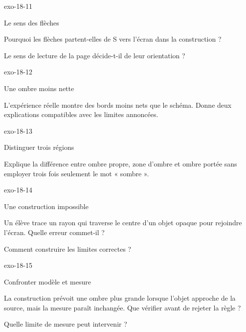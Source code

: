 \documentclass[12pt,twoside,openany]{book}
\begin{document}
\begin{blocLivre}{exo-18-11}
\begin{exercice}[2]{Le sens des flèches}
\begin{questions}
\item Pourquoi les flèches partent-elles de S vers l’écran dans la construction ?
\item Le sens de lecture de la page décide-t-il de leur orientation ?
\end{questions}
\end{exercice}\end{blocLivre}
\begin{blocLivre}{exo-18-12}
\begin{exercice}[3]{Une ombre moins nette}
\begin{questions}
\item L’expérience réelle montre des bords moins nets que le schéma. Donne deux explications compatibles avec les limites annoncées.
\end{questions}
\end{exercice}\end{blocLivre}
\clearpage
\begin{blocLivre}{exo-18-13}
\begin{exercice}[3]{Distinguer trois régions}
\begin{questions}
\item Explique la différence entre ombre propre, zone d’ombre et ombre portée sans employer trois fois seulement le mot « sombre ».
\end{questions}
\end{exercice}\end{blocLivre}
\begin{blocLivre}{exo-18-14}
\begin{exercice}[3]{Une construction impossible}
\begin{questions}
\item Un élève trace un rayon qui traverse le centre d’un objet opaque pour rejoindre l’écran. Quelle erreur commet-il ?
\item Comment construire les limites correctes ?
\end{questions}
\end{exercice}\end{blocLivre}
\begin{blocLivre}{exo-18-15}
\begin{exercice}[3]{Confronter modèle et mesure}
\begin{questions}
\item La construction prévoit une ombre plus grande lorsque l’objet approche de la source, mais la mesure paraît inchangée. Que vérifier avant de rejeter la règle ?
\item Quelle limite de mesure peut intervenir ?
\end{questions}
\end{exercice}\end{blocLivre}
\end{document}
